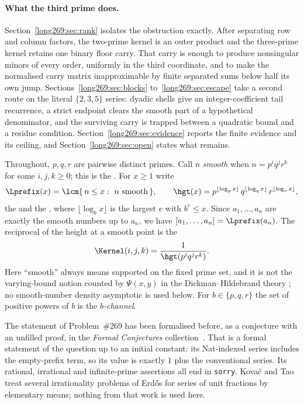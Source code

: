 \paragraph{What the third prime does.}
Section~\ref{long269:sec:rank} isolates the obstruction exactly.  After separating row
and column factors, the two-prime kernel is an outer product and the
three-prime kernel retains one binary floor carry.  That carry is enough to
produce nonsingular minors of every order, uniformly in the third coordinate,
and to make the normalised carry matrix inapproximable by finite separated sums
below half its own jump.  Sections~\ref{long269:sec:blocks} to~\ref{long269:sec:escape} take a
second route on the literal $\{2,3,5\}$ series: dyadic shells give an
integer-coefficient tail recurrence, a strict endpoint clears the smooth part
of a hypothetical denominator, and the surviving carry is trapped between a
quadratic bound and a residue condition.  Section~\ref{long269:sec:evidence} reports
the finite evidence and its ceiling, and Section~\ref{long269:sec:open} states what
remains.

Throughout, $p,q,r$ are pairwise distinct primes.  Call $n$ \emph{smooth} when
$n=p^{i}q^{j}r^{k}$ for some $i,j,k\ge0$; this is the
.  For $x\ge1$ write
\[
 \Lprefix(x)=\lcm\{\,n\le x:\ n\ \text{smooth}\,\},
 \qquad
 \hgt(x)=p^{\lfloor\log_p x\rfloor}\,q^{\lfloor\log_q x\rfloor}\,
 r^{\lfloor\log_r x\rfloor},
\]
the
 and the
, where $\lfloor\log_b x\rfloor$ is the largest $e$ with $b^{e}\le x$.
Since $a_1,\ldots,a_n$ are exactly the smooth numbers up to $a_n$, we have
$[a_1,\ldots,a_n]=\Lprefix(a_n)$.  The reciprocal of the height at a smooth
point is the
\[
 \Kernel(i,j,k)=\frac{1}{\hgt(p^{i}q^{j}r^{k})} .
\]
Here ``smooth'' always means supported on the fixed prime set, and it is not
the varying-bound notion counted by $\Psi(x,y)$ in the Dickman--Hildebrand
theory \cite[Theorem~1]{hildebrand1986}; no smooth-number density asymptotic is
used below.  For $b\in\{p,q,r\}$ the set of positive powers of $b$ is the
\emph{$b$-channel}.

The statement of Problem~\#269 has been formalised before, as a conjecture with
an unfilled proof, in the \emph{Formal Conjectures}
collection~\cite{formalconjectures269}.  That is a formal statement of the
question up to an initial constant: its Nat-indexed series includes the
empty-prefix term, so its value is exactly \(1\) plus the conventional series.
Its rational, irrational and infinite-prime
assertions all end in \texttt{sorry}.  Kova\v{c} and Tao~\cite{kovactao2024}
treat several irrationality problems of Erd\H{o}s for series of unit fractions
by elementary means; nothing from that work is used here.


